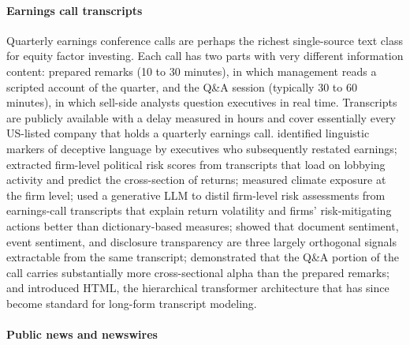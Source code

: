\paragraph{Earnings call transcripts}

Quarterly earnings conference calls are perhaps the richest single-source text class for equity factor investing. Each call has two parts with very different information content: prepared remarks (10 to 30 minutes), in which management reads a scripted account of the quarter, and the Q\&A session (typically 30 to 60 minutes), in which sell-side analysts question executives in real time. Transcripts are publicly available with a delay measured in hours and cover essentially every US-listed company that holds a quarterly earnings call. \cite{larcker2012detecting} identified linguistic markers of deceptive language by executives who subsequently restated earnings; \cite{hassan2019politicalrisk} extracted firm-level political risk scores from transcripts that load on lobbying activity and predict the cross-section of returns; \cite{sautner2023firm} measured climate exposure at the firm level; \cite{kim2024transcripts} used a generative LLM to distil firm-level risk assessments from earnings-call transcripts that explain return volatility and firms' risk-mitigating actions better than dictionary-based measures; \cite{hafez2021transcripts} showed that document sentiment, event sentiment, and disclosure transparency are three largely orthogonal signals extractable from the same transcript; \cite{zhao2018alpha} demonstrated that the Q\&A portion of the call carries substantially more cross-sectional alpha than the prepared remarks; and \cite{yang2020html} introduced HTML, the hierarchical transformer architecture that has since become standard for long-form transcript modeling.

\paragraph{Public news and newswires}

